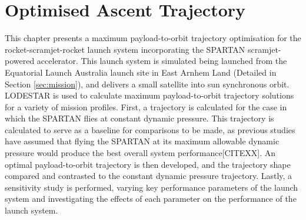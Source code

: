
\cleardoublepage
\chapter{Optimised Ascent Trajectory}\label{chapter:Ascent}

This chapter presents a maximum payload-to-orbit trajectory optimisation for the rocket-scramjet-rocket launch system incorporating the SPARTAN scramjet-powered accelerator. 
This launch system is simulated being launched from the Equatorial Launch Australia launch site in East Arnhem Land (Detailed in Section \ref{sec:mission}), and delivers a small satellite into sun synchronous orbit. LODESTAR is used to calculate maximum payload-to-orbit trajectory solutions for a variety of mission profiles.
First, a trajectory is calculated for the case in which the SPARTAN flies at constant dynamic pressure. This trajectory is calculated to serve as a baseline for comparisons to be made, as previous studies have assumed that flying the SPARTAN at its maximum allowable dynamic pressure would produce the best overall system performance[CITEXX]. An optimal payload-to-orbit trajectory is then developed, and the trajectory shape compared and contrasted to the constant dynamic pressure trajectory.
Lastly, a sensitivity study is performed, varying key performance parameters of the launch system and investigating the effects of each parameter on the performance of the launch system. 

